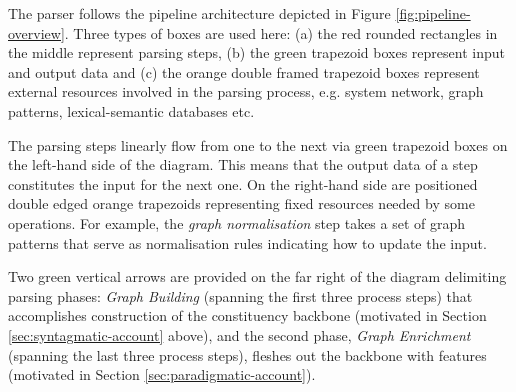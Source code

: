     The parser follows the pipeline architecture depicted in Figure \ref{fig:pipeline-overview}. Three types of boxes are used here: (a) the red rounded rectangles in the middle represent parsing steps, (b) the green trapezoid boxes represent input and output data and (c) the orange double framed trapezoid boxes represent external resources involved in the parsing process, e.g. system network, graph patterns, lexical-semantic databases etc. 
    
    The parsing steps linearly flow from one to the next via green trapezoid boxes on the left-hand side of the diagram. This means that the output data of a step constitutes the input for the next one. On the right-hand side are positioned double edged orange trapezoids representing fixed resources needed by some operations. For example, the \textit{graph normalisation} step takes a set of graph patterns that serve as normalisation rules indicating how to update the input.

    Two green vertical arrows are provided on the far right of the diagram delimiting parsing phases: \textit{Graph Building} (spanning the first three process steps) that accomplishes construction of the constituency backbone (motivated in Section \ref{sec:syntagmatic-account} above), and the second phase, \textit{Graph Enrichment} (spanning the last three process steps), fleshes out the backbone with features (motivated in Section \ref{sec:paradigmatic-account}).


